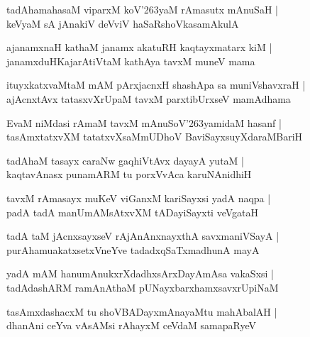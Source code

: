 \documentclass[twoside,12pt,openright]{book}
\def\S{\char'263}
\newcounter{shloka}[chapter]
\begin{document}
\begin{shloka}%
tadAhamahasaM viparxM koV\S yaM rAmasutx mAnuSaH |\\
keVyaM sA jAnakiV deVviV haSaRshoVkasamAkulA 
\end{shloka}

\begin{shloka}%
ajanamxnaH kathaM janamx akatuRH kaqtayxmatarx kiM |\\
janamxduHKajarAtiVtaM kathAya tavxM muneV mama 
\end{shloka}

\begin{shloka}%
ituyxkatxvaMtaM mAM pArxjacnxH shashApa sa muniVshavxraH |\\
ajAcnxtAvx tatasxvXrUpaM tavxM parxtibUrxseV mamAdhama
\end{shloka}

\begin{shloka}%
EvaM niMdasi rAmaM tavxM mAnuSoV\S yamidaM hasanf |\\
tasAmxtatxvXM tatatxvXsaMmUDhoV BaviSayxsuyXdaraMBariH 
\end{shloka}

\begin{shloka}%
tadAhaM tasayx caraNw gaqhiVtAvx dayayA yutaM |\\
kaqtavAnasx  punamARM  tu porxVvAca karuNAnidhiH
\end{shloka}

\begin{shloka}%
tavxM rAmasayx muKeV viGanxM kariSayxsi yadA naqpa |\\
padA tadA manUmAMsAtxvXM tADayiSayxti veVgataH 
\end{shloka}

\begin{shloka}%
tadA taM jAcnxsayxseV rAjAnAnxnayxthA savxmaniVSayA |\\
purAhamuakatxsetxVneYve tadadxqSaTxmadhunA mayA 
\end{shloka}

\begin{shloka}%
yadA mAM hanumAnukxrXdadhxsArxDayAmAsa vakaSxsi |\\
tadAdashARM ramAnAthaM pUNayxbarxhamxsavxrUpiNaM 
\end{shloka}

\begin{shloka}%
tasAmxdashacxM tu shoVBADayxmAnayaMtu mahAbalAH |\\
dhanAni ceYva vAsAMsi rAhayxM  ceVdaM samapaRyeV 
\end{shloka}
\end{document}
